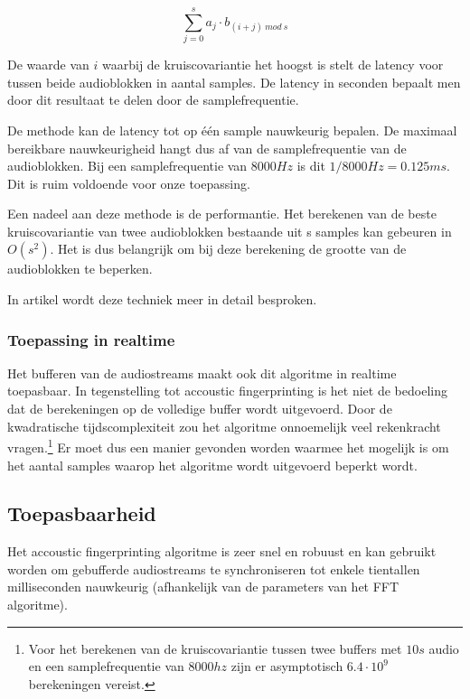 \begin{equation}
\sum_{j=0}^{s} a_{j} \cdot b_{(i+j)\ mod\ s}
\end{equation}

De waarde van $ i $ waarbij de kruiscovariantie het hoogst is stelt de latency voor tussen beide audioblokken in aantal samples. De latency in seconden bepaalt men door dit resultaat te delen door de samplefrequentie.

De methode kan de latency tot op één sample nauwkeurig bepalen. De maximaal bereikbare nauwkeurigheid hangt dus af van de samplefrequentie van de audioblokken. Bij een samplefrequentie van $8000 Hz$ is dit $ 1/8000 Hz = 0.125 ms $. Dit is ruim voldoende voor onze toepassing.

Een nadeel aan deze methode is de performantie. Het berekenen van de beste kruiscovariantie van twee audioblokken bestaande uit s samples kan gebeuren in  $O(s^{2})$. Het is dus belangrijk om bij deze berekening de grootte van de audioblokken te beperken.

In artikel \cite{six2015multimodal} wordt deze techniek meer in detail besproken.

\subsubsection{Toepassing in realtime}

Het bufferen van de audiostreams maakt ook dit algoritme in realtime toepasbaar. In tegenstelling tot accoustic fingerprinting is het niet de bedoeling dat de berekeningen op de volledige buffer wordt uitgevoerd. Door de kwadratische tijdscomplexiteit zou het algoritme onnoemelijk veel rekenkracht vragen.\footnote{Voor het berekenen van de kruiscovariantie tussen twee buffers met $10s$ audio en een samplefrequentie van $8000hz$ zijn er asymptotisch $ 6.4 \cdot 10^9 $ berekeningen vereist.} Er moet dus een manier gevonden worden waarmee het mogelijk is om het aantal samples waarop het algoritme wordt uitgevoerd beperkt wordt.

\subsection{Toepasbaarheid}

Het accoustic fingerprinting algoritme is zeer snel en robuust en kan gebruikt worden om gebufferde audiostreams te synchroniseren tot enkele tientallen milliseconden nauwkeurig (afhankelijk van de parameters van het FFT algoritme).

